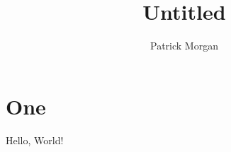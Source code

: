 \documentclass[twoside]{article}
\begin{document}
  \title{Untitled}                               %
  \author{Patrick Morgan}                        %

  \pagestyle{headings} %
  \thispagestyle{plain} %

  \maketitle


  \section{One}

  Hello, World!

\end{document}
